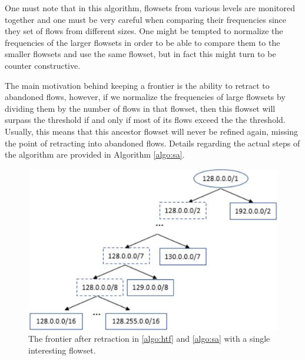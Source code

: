One must note that in this algorithm, flowsets from various levels are monitored together and one must be very careful when comparing their frequencies since they set of flows from different sizes. One might be tempted to normalize the frequencies of the larger flowsets in order to be able to compare them to the smaller flowsets and use the same flowset, but in fact this might turn to be counter constructive.

The main motivation behind keeping a frontier is the ability to retract to abandoned flows, however, if we normalize the frequencies of large flowsets by dividing them by the number of flows in that flowset, then this flowset will surpass the threshold if and only if most of its flows exceed the the threshold. Usually, this means that this ancestor flowset will never be refined again, missing the point of retracting into abandoned flows.  Details regarding the actual steps of the algorithm are provided in Algorithm  \ref{algo:sa}.

\begin{figure}
	\centering
	\includegraphics[width=\linewidth]{HHH/jpg_figures/sa_vs_htf.JPG}
\caption[An example of a frontier after retraction in \ref{algo:htf} and \ref{algo:sa} algorithms]{The frontier after retraction in \ref{algo:htf} and \ref{algo:sa} with a single interesting flowset.}
\label{fig:sa_vs_htf}
\end{figure}

